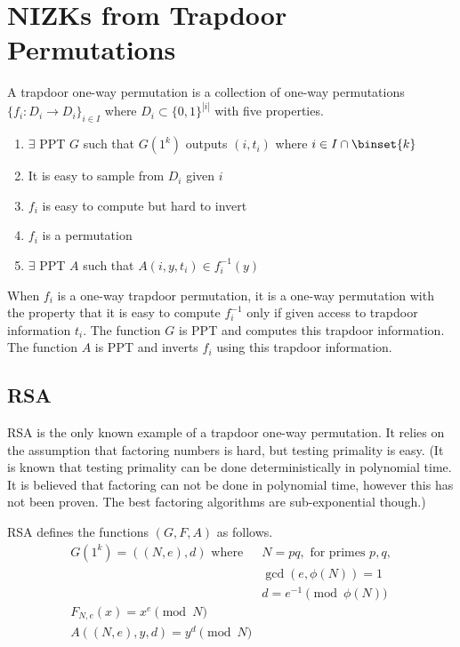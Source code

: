 \section{NIZKs from Trapdoor Permutations}

\begin{definition}
A trapdoor one-way permutation is a collection of one-way permutations $\{f_i : D_i \rightarrow D_i\}_{i \in I}$ where $D_i \subset \{0,1\}^{|i|}$ with
five properties.

\begin{enumerate}
\item $\exists$ PPT $G$ such that $G(1^k)$ outputs $(i,t_i)$ where $i \in I\cap \binset{k}$
\item It is easy to sample from $D_i$ given $i$ 
\item $f_i$ is easy to compute but hard to invert
\item  $f_i$ is a permutation
\item $\exists$ PPT $A$ such that $A(i, y, t_i)\in f_i^{-1}(y)$
\end{enumerate}
\end{definition}

When $f_i$ is a one-way trapdoor permutation, it is a one-way permutation with
the property that it is easy to compute $f_i^{-1}$ only if given access to trapdoor
information $t_i$. The function $G$ is PPT and computes this trapdoor information.
The function $A$ is PPT and inverts $f_i$ using this trapdoor information.

\subsection{RSA}

RSA is the only known example of a trapdoor one-way permutation.
It relies on the assumption that factoring numbers is hard,
but testing primality is easy. (It is known that testing primality can be done
deterministically in polynomial time. It is believed that factoring can not be done in
polynomial time, however this has not been proven. The best factoring algorithms
are sub-exponential though.)

\begin{definition}
RSA defines the functions $(G, F, A)$ as follows.
\begin{align*}
G(1^k) = ((N, e), d) \,\,\text{where} \,\,& N=pq, \,\, \text{for primes $p,q$},  \\
& \gcd(e,\phi(N))=1 \\
& d = e^{-1} \pmod{\phi(N)} \\
F_{N,e}(x) = x^e \pmod{N} & \\
A((N,e),y, d) = y^d \pmod{N} &
\end{align*}
\end{definition}

